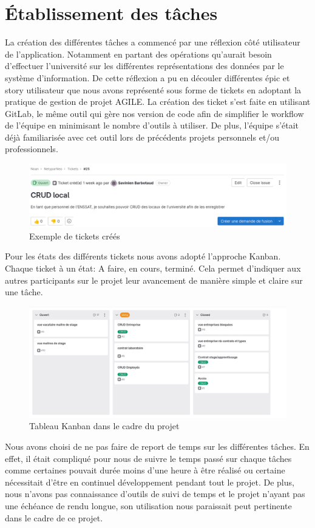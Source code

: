 \documentclass[french,12pt,a4paper,titlepage]{report}
\begin{document}
	\section{Établissement des tâches}
	La création des différentes tâches a commencé par une réflexion côté utilisateur de l'application. Notamment en partant des opérations qu'aurait besoin d'effectuer l'université sur les différentes représentations des données par le système d'information. De cette réflexion a pu en découler différentes épic et story utilisateur que nous avons représenté sous forme de tickets en adoptant la pratique de gestion de projet AGILE.
	\newline
	\newline
	La création des ticket s'est faite en utilisant GitLab, le même outil qui gère nos version de code afin de simplifier le workflow de l'équipe en minimisant le nombre d'outils à utiliser. De plus, l'équipe s'était déjà familiarisée avec cet outil lors de précédents projets personnels et/ou professionnels.
	\newline
	\begin{figure}[ht]
		\centering
		\includegraphics[width=0.7\linewidth]{rapports_assets/screenshot001}
		\caption{Exemple de tickets créés}
		\label{fig:screenshot001}
	\end{figure}
	\newline
	Pour les états des différents tickets nous avons adopté l'approche Kanban. Chaque ticket à un état: A faire, en cours, terminé. Cela permet d'indiquer aux autres participants sur le projet leur avancement de manière simple et claire sur une tâche.
	\newline
	\begin{figure}[ht]
		\centering
		\includegraphics[width=0.7\linewidth]{rapports_assets/screenshot002}
		\caption{Tableau Kanban dans le cadre du projet}
		\label{fig:screenshot002}
	\end{figure}
	\newline
	Nous avons choisi de ne pas faire de report de temps sur les différentes tâches. En effet, il était compliqué pour nous de suivre le temps passé sur chaque tâches comme certaines pouvait durée moins d'une heure à être réalisé ou certaine nécessitait d'être en continuel développement pendant tout le projet. De plus, nous n'avons pas connaissance d'outils de suivi de temps et le projet n'ayant pas une échéance de rendu longue, son utilisation nous paraissait peut pertinente dans le cadre de ce projet.
\end{document}
